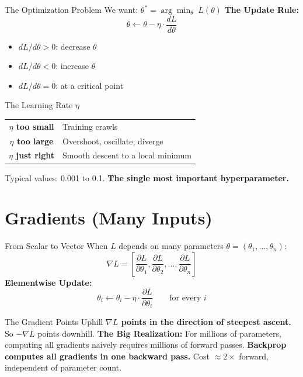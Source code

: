 \documentclass[10pt]{beamer}
\begin{document}
\begin{frame}{The Optimization Problem}
    We want: $\theta^* = \arg\min_\theta \; L(\theta)$
    \vspace{0.5cm}
    \textbf{The Update Rule:}
    \[
        \theta \leftarrow \theta - \eta \cdot \frac{dL}{d\theta}
    \]
    \begin{itemize}
        \item $dL/d\theta > 0$: decrease $\theta$
        \item $dL/d\theta < 0$: increase $\theta$
        \item $dL/d\theta = 0$: at a critical point
    \end{itemize}
\end{frame}

\begin{frame}{The Learning Rate $\eta$}
    \begin{tabular}{c|l}
        \toprule
        \textbf{$\eta$ too small} & Training crawls \\
        \textbf{$\eta$ too large} & Overshoot, oscillate, diverge \\
        \textbf{$\eta$ just right} & Smooth descent to a local minimum \\
        \bottomrule
    \end{tabular}
    Typical values: 0.001 to 0.1. \textbf{The single most important hyperparameter.}
\end{frame}

\section{Gradients (Many Inputs)}

\begin{frame}{From Scalar to Vector}
    When $L$ depends on many parameters $\theta = (\theta_1, \ldots, \theta_n)$:
    \[
        \nabla L = \left[\frac{\partial L}{\partial \theta_1}, \frac{\partial L}{\partial \theta_2}, \ldots, \frac{\partial L}{\partial \theta_n}\right]
    \]
    \textbf{Elementwise Update:}
    \[
        \theta_i \leftarrow \theta_i - \eta \cdot \frac{\partial L}{\partial \theta_i} \qquad \text{for every } i
    \]
\end{frame}

\begin{frame}{The Gradient Points Uphill}
    \textbf{$\nabla L$ points in the direction of steepest ascent.} So $-\nabla L$ points downhill.
    \vspace{0.5cm}
    \textbf{The Big Realization:} For millions of parameters, computing all gradients naively requires millions of forward passes.
    \textbf{Backprop computes all gradients in one backward pass.} Cost $\approx 2\times$ forward, independent of parameter count.
\end{frame}
\end{document}
